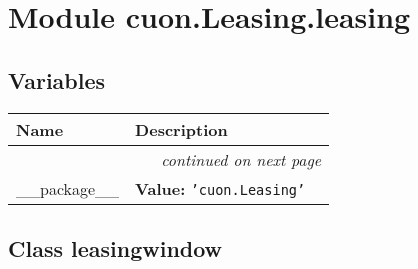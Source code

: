%
%
%


\section{Module cuon.Leasing.leasing}

    \label{cuon:Leasing:leasing}


  \subsection{Variables}

    \vspace{-1cm}
\hspace{\varindent}\begin{longtable}{|p{\varnamewidth}|p{\vardescrwidth}|l}
\cline{1-2}
\cline{1-2} \centering \textbf{Name} & \centering \textbf{Description}& \\
\cline{1-2}
\endhead\cline{1-2}\multicolumn{3}{r}{\small\textit{continued on next page}}\\\endfoot\cline{1-2}
\endlastfoot\raggedright \_\-\_\-p\-a\-c\-k\-a\-g\-e\-\_\-\_\- & \raggedright \textbf{Value:} 
{\tt \texttt{'}\texttt{cuon.Leasing}\texttt{'}}&\\
\cline{1-2}
\end{longtable}



\subsection{Class leasingwindow}

